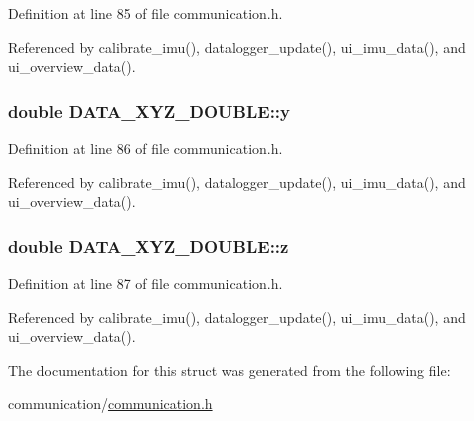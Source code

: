 Definition at line 85 of file communication.\-h.



Referenced by calibrate\-\_\-imu(), datalogger\-\_\-update(), ui\-\_\-imu\-\_\-data(), and ui\-\_\-overview\-\_\-data().

\hypertarget{structDATA__XYZ__DOUBLE_a198a27b5df3b5b0bf461b0e481e22a82}{
\subsubsection[{y}]{\setlength{\rightskip}{0pt plus 5cm}double D\-A\-T\-A\-\_\-\-X\-Y\-Z\-\_\-\-D\-O\-U\-B\-L\-E\-::y}}\label{structDATA__XYZ__DOUBLE_a198a27b5df3b5b0bf461b0e481e22a82}


Definition at line 86 of file communication.\-h.



Referenced by calibrate\-\_\-imu(), datalogger\-\_\-update(), ui\-\_\-imu\-\_\-data(), and ui\-\_\-overview\-\_\-data().

\hypertarget{structDATA__XYZ__DOUBLE_a9556e8868c223ff3e28756ea18a284c0}{
\subsubsection[{z}]{\setlength{\rightskip}{0pt plus 5cm}double D\-A\-T\-A\-\_\-\-X\-Y\-Z\-\_\-\-D\-O\-U\-B\-L\-E\-::z}}\label{structDATA__XYZ__DOUBLE_a9556e8868c223ff3e28756ea18a284c0}


Definition at line 87 of file communication.\-h.



Referenced by calibrate\-\_\-imu(), datalogger\-\_\-update(), ui\-\_\-imu\-\_\-data(), and ui\-\_\-overview\-\_\-data().



The documentation for this struct was generated from the following file\-:\begin{DoxyCompactItemize}
\item 
communication/\hyperlink{communication_2communication_8h}{communication.\-h}\end{DoxyCompactItemize}
